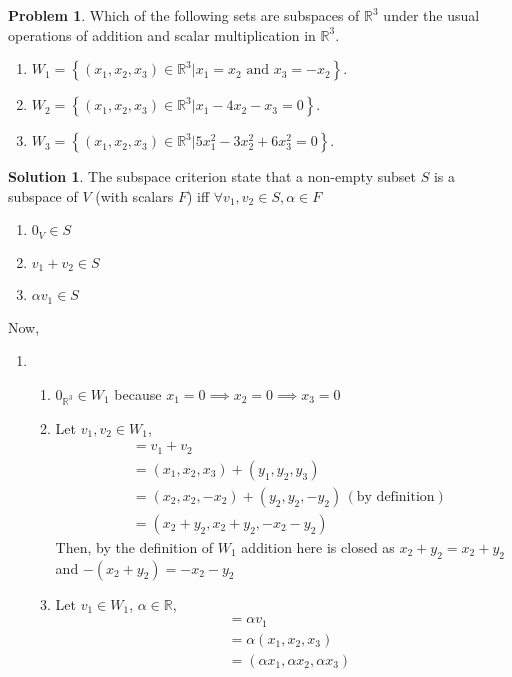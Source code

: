 \documentclass[10pt]{article}
\theoremstyle{definition}
\newtheorem{problem}{Problem}
\newtheorem{soln}{Solution}
\begin{document}
\begin{problem}
Which of the following sets are subspaces of $\mathbb{R}^3$ under the usual operations of addition and scalar multiplication in $\mathbb{R}^3$.
\begin{enumerate}[label=(\alph*)]
  \item $\displaystyle W_1 = \left\{(x_1, x_2, x_3) \in\mathbb{R}^3|x_1= x_2 \text{ and } x_3=-x_2\right\}.$
  \item $\displaystyle W_2 = \left\{(x_1, x_2, x_3) \in\mathbb{R}^3|x_1-4x_2-x_3=0\right\}.$
  \item $\displaystyle W_3 = \left\{(x_1, x_2, x_3) \in\mathbb{R}^3|5x_1^2-3x_2^2+6x_3^2=0\right\}.$
\end{enumerate}
\end{problem}
\begin{soln}
The subspace criterion state that a non-empty subset $S$ is a subspace of $V$ (with scalars $F$) iff $\forall v_1,v_2\in S,\alpha\in F$
\begin{enumerate}[label=(\roman*)]
  \item $0_V\in S$
  \item $v_1+v_2\in S$
  \item $\alpha v_1\in S$
\end{enumerate}
Now,
\begin{enumerate}[label=(\alph*)]
  \item \begin{enumerate}[label=(\roman*)]
    \item $0_{\mathbb{R}^3}\in W_1$ because $x_1=0\implies x_2=0\implies x_3=0$
    \item Let $v_1,v_2\in W_1$,
    \begin{align*}
      & = v_1+v_2\\
      & = (x_1,x_2,x_3)+(y_1,y_2,y_3)\\
      & = (x_2,x_2,-x_2)+(y_2,y_2,-y_2)\,(\text{by definition})\\
      & = (x_2+y_2,x_2+y_2,-x_2-y_2)
    \end{align*}
    Then, by the definition of $W_1$ addition here is closed as $x_2+y_2=x_2+y_2$ and $-(x_2+y_2)=-x_2-y_2$
    \item Let $v_1\in W_1$, $\alpha\in\mathbb{R}$,
    \begin{align*}
      & = \alpha v_1\\
      & = \alpha(x_1,x_2,x_3)\\
      & = (\alpha x_1,\alpha x_2,\alpha x_3)\\

\end{align*}
\end{enumerate}
\end{enumerate}
\end{soln}
\end{document}
